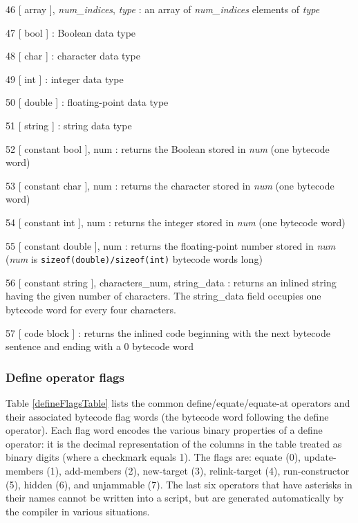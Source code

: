 \documentclass{article}
\begin{document}
\begin{description}
\item{46  [ array ],  \emph{num\_indices}, \emph{type}} : an array of \emph{num\_indices} elements of \emph{type}
\item{47  [ bool ]} : Boolean data type
\item{48  [ char ]} : character data type
\item{49  [ int ]} : integer data type
\item{50  [ double ]} : floating-point data type
\item{51  [ string ]} : string data type

\item{52  [ constant bool ], num} : returns the Boolean stored in \emph{num} (one bytecode word)
\item{53  [ constant char ], num} : returns the character stored in \emph{num} (one bytecode word)
\item{54  [ constant int ], num} : returns the integer stored in \emph{num} (one bytecode word)
\item{55  [ constant double ], num} : returns the floating-point number stored in \emph{num} (\emph{num} is \verb#sizeof(double)/sizeof(int)# bytecode words long)
\item{56  [ constant string ], characters\_num, string\_data} : returns an inlined string having the given number of characters.  The string\_data field occupies one bytecode word for every four characters.
\item{57  [ code block ]} : returns the inlined code beginning with the next bytecode sentence and ending with a 0 bytecode word


\end{description}





\subsubsection{Define operator flags} 


Table \ref{defineFlagsTable} lists the common define/equate/equate-at operators and their associated bytecode flag words (the bytecode word following the define operator).  Each flag word encodes the various binary properties of a define operator:  it is the decimal representation of the columns in the table treated as binary digits (where a checkmark equals 1).  The flags are:  equate (0), update-members (1), add-members (2), new-target (3), relink-target (4), run-constructor (5), hidden (6), and unjammable (7).  The last six operators that have asterisks in their names cannot be written into a script, but are generated automatically by the compiler in various situations.\\
\end{document}
